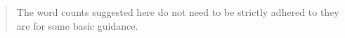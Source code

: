 \documentclass[12pt,a4paper]{article}
\begin{document}
\maketitle

\begin{abstract}
The word counts suggested here do not need to be strictly adhered to they are for some basic guidance.
\end{abstract}







\appendix
\clearpage


\end{document}
